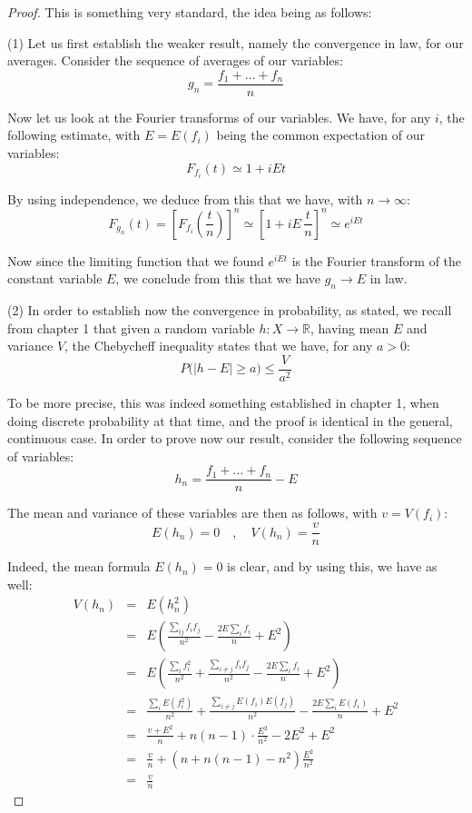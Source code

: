 \documentclass[12pt]{amsbook}
\begin{document}
\begin{proof}
This is something very standard, the idea being as follows:

\medskip

(1) Let us first establish the weaker result, namely the convergence in law, for our averages. Consider the sequence of averages of our variables:
$$g_n=\frac{f_1+\ldots+f_n}{n}$$

Now let us look at the Fourier transforms of our variables. We have, for any $i$, the following estimate, with $E=E(f_i)$ being the common expectation of our variables:
$$F_{f_i}(t)\simeq 1+iEt$$

By using independence, we deduce from this that we have, with $n\to\infty$:
$$F_{g_n}(t)
=\left[F_{f_i}\left(\frac{t}{n}\right)\right]^n
\simeq\left[1+iE\,\frac{t}{n}\right]^n
\simeq e^{iEt}$$

Now since the limiting function that we found $e^{iEt}$ is the Fourier transform of the constant variable $E$, we conclude from this that we have $g_n\to E$ in law.

\medskip

(2) In order to establish now the convergence in probability, as stated, we recall from chapter 1 that given a random variable $h:X\to\mathbb R$, having mean $E$ and variance $V$, the Chebycheff inequality states that we have, for any $a>0$:
$$P\big(|h-E|\geq a\big)\leq\frac{V}{a^2}$$

To be more precise, this was indeed something established in chapter 1, when doing discrete probability at that time, and the proof is identical in the general, continuous case. In order to prove now our result, consider the following sequence of variables:
$$h_n=\frac{f_1+\ldots+f_n}{n}-E$$

The mean and variance of these variables are then as follows, with $v=V(f_i)$:
$$E(h_n)=0\quad,\quad V(h_n)=\frac{v}{n}$$

Indeed, the mean formula $E(h_n)=0$ is clear, and by using this, we have as well:
\begin{eqnarray*}
V(h_n)
&=&E(h_n^2)\\
&=&E\left(\frac{\sum_{ij}f_if_j}{n^2}-\frac{2E\sum_if_i}{n}+E^2\right)\\
&=&E\left(\frac{\sum_if_i^2}{n^2}+\frac{\sum_{i\neq j}f_if_j}{n^2}-\frac{2E\sum_if_i}{n}+E^2\right)\\
&=&\frac{\sum_iE(f_i^2)}{n^2}+\frac{\sum_{i\neq j}E(f_i)E(f_j)}{n^2}-\frac{2E\sum_iE(f_i)}{n}+E^2\\
&=&\frac{v+E^2}{n}+n(n-1)\cdot\frac{E^2}{n^2}-2E^2+E^2\\
&=&\frac{v}{n}+\left(n+n(n-1)-n^2\right)\frac{E^2}{n^2}\\
&=&\frac{v}{n}
\end{eqnarray*}


\end{proof}
\end{document}
